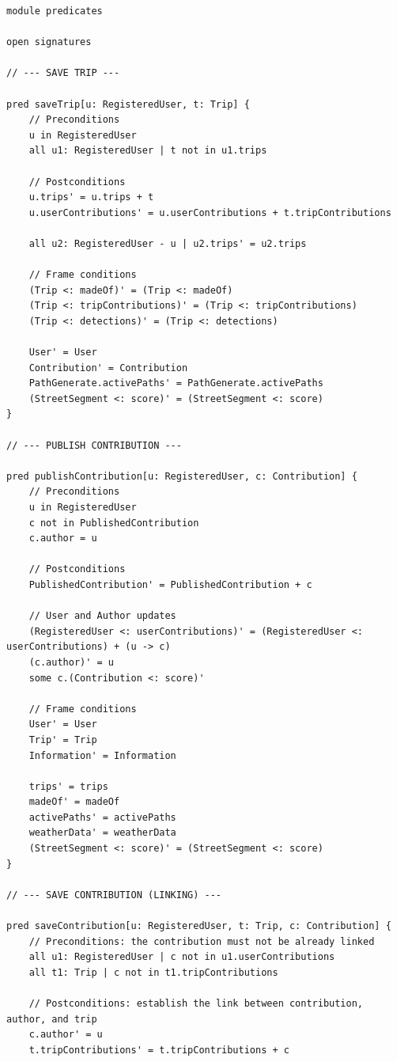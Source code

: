 \begin{lstlisting}[language=alloy, caption={Alloy Predicates for BBP}, label={lst:predicates}]
module predicates

open signatures

// --- SAVE TRIP ---

pred saveTrip[u: RegisteredUser, t: Trip] {
    // Preconditions
    u in RegisteredUser
    all u1: RegisteredUser | t not in u1.trips

    // Postconditions
    u.trips' = u.trips + t
    u.userContributions' = u.userContributions + t.tripContributions

    all u2: RegisteredUser - u | u2.trips' = u2.trips

    // Frame conditions
    (Trip <: madeOf)' = (Trip <: madeOf)
    (Trip <: tripContributions)' = (Trip <: tripContributions)
    (Trip <: detections)' = (Trip <: detections)

    User' = User
    Contribution' = Contribution
    PathGenerate.activePaths' = PathGenerate.activePaths
    (StreetSegment <: score)' = (StreetSegment <: score)
}

// --- PUBLISH CONTRIBUTION ---

pred publishContribution[u: RegisteredUser, c: Contribution] {
    // Preconditions
    u in RegisteredUser
    c not in PublishedContribution
    c.author = u

    // Postconditions
    PublishedContribution' = PublishedContribution + c

    // User and Author updates
    (RegisteredUser <: userContributions)' = (RegisteredUser <: userContributions) + (u -> c)
    (c.author)' = u
    some c.(Contribution <: score)'

    // Frame conditions
    User' = User
    Trip' = Trip
    Information' = Information

    trips' = trips
    madeOf' = madeOf
    activePaths' = activePaths
    weatherData' = weatherData
    (StreetSegment <: score)' = (StreetSegment <: score)
}

// --- SAVE CONTRIBUTION (LINKING) ---

pred saveContribution[u: RegisteredUser, t: Trip, c: Contribution] {
    // Preconditions: the contribution must not be already linked
    all u1: RegisteredUser | c not in u1.userContributions
    all t1: Trip | c not in t1.tripContributions

    // Postconditions: establish the link between contribution, author, and trip
    c.author' = u
    t.tripContributions' = t.tripContributions + c


\end{lstlisting}
